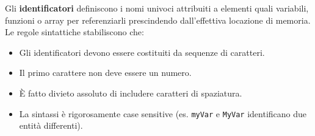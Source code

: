 Gli \textbf{identificatori} definiscono i nomi univoci attribuiti a elementi quali variabili, funzioni o array per referenziarli prescindendo dall'effettiva locazione di memoria. Le regole sintattiche stabiliscono che:
\begin{itemize}
    \item Gli identificatori devono essere costituiti da sequenze di caratteri.
    \item Il primo carattere non deve essere un numero.
    \item È fatto divieto assoluto di includere caratteri di spaziatura.
    \item La sintassi è rigorosamente case sensitive (es. \texttt{myVar} e \texttt{MyVar} identificano due entità differenti).
\end{itemize}


